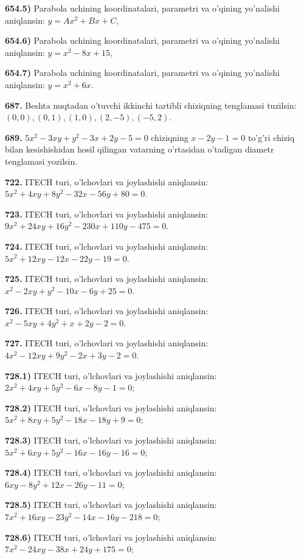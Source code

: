 \textbf{654.5)} Parabola uchining koordinatalari, parametri va o'qining yo'nalishi aniqlansin: \(y = Ax^{2} + Bx + C\),

\textbf{654.6)} Parabola uchining koordinatalari, parametri va o'qining yo'nalishi aniqlansin: \(y = x^{2} - 8x + 15\),

\textbf{654.7)} Parabola uchining koordinatalari, parametri va o'qining yo'nalishi aniqlansin: \(y = x^{2} + 6x\).

\textbf{687.} Beshta nuqtadan o'tuvchi ikkinchi tartibli chiziqning tenglamasi tuzilsin: \((0,0),(0,1),(1,0),(2, - 5),( - 5,2)\).

\textbf{689.} \(5x^{2} - 3xy + y^{2} - 3x + 2y - 5 = 0\) chiziqning \(x - 2y - 1 = 0\) to'g'ri chiziq bilan kesishishidan hosil qilingan vatarning o'rtasidan o'tadigan diametr tenglamasi yozilsin.

\textbf{722.} ITECH turi, o'lchovlari va joylashishi aniqlansin: \(5x^{2} + 4xy + 8y^{2} - 32x - 56y + 80 = 0\).

\textbf{723.} ITECH turi, o'lchovlari va joylashishi aniqlansin: \(9x^{2} + 24xy + 16y^{2} - 230x + 110y - 475 = 0\).

\textbf{724.} ITECH turi, o'lchovlari va joylashishi aniqlansin: \(5x^{2} + 12xy - 12x - 22y - 19 = 0\).

\textbf{725.} ITECH turi, o'lchovlari va joylashishi aniqlansin: \(x^{2} - 2xy + y^{2} - 10x - 6y + 25 = 0\).

\textbf{726.} ITECH turi, o'lchovlari va joylashishi aniqlansin: \(x^{2} - 5xy + 4y^{2} + x + 2y - 2 = 0\).

\textbf{727.} ITECH turi, o'lchovlari va joylashishi aniqlansin: \(4x^{2} - 12xy + 9y^{2} - 2x + 3y - 2 = 0\).

\textbf{728.1)} ITECH turi, o'lchovlari va joylashishi aniqlansin: \(2x^{2} + 4xy + 5y^{2} - 6x - 8y - 1 = 0\);

\textbf{728.2)} ITECH turi, o'lchovlari va joylashishi aniqlansin: \(5x^{2} + 8xy + 5y^{2} - 18x - 18y + 9 = 0\);

\textbf{728.3)} ITECH turi, o'lchovlari va joylashishi aniqlansin: \(5x^{2} + 6xy + 5y^{2} - 16x - 16y - 16 = 0\);

\textbf{728.4)} ITECH turi, o'lchovlari va joylashishi aniqlansin: \(6xy - 8y^{2} + 12x - 26y - 11 = 0\);

\textbf{728.5)} ITECH turi, o'lchovlari va joylashishi aniqlansin: \(7x^{2} + 16xy - 23y^{2} - 14x - 16y - 218 = 0\);

\textbf{728.6)} ITECH turi, o'lchovlari va joylashishi aniqlansin: \(7x^{2} - 24xy - 38x + 24y + 175 = 0\);

